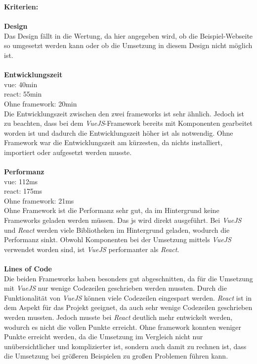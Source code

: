 \textbf{Kriterien:}\\\\
\textbf{Design}\\
Das Design fällt in die Wertung, da hier angegeben wird, ob die Beispiel-Webseite so umgesetzt werden kann oder ob die Umsetzung in diesem Design nicht möglich ist.\\\\
\newpage
\textbf{Entwicklungszeit}\\
\Gls{vue}: 40min\\
\Gls{react}: 55min\\
Ohne \Gls{framework}: 20min\\
Die Entwicklungszeit zwischen den zwei \Gls{framework}s ist sehr ähnlich. Jedoch ist zu beachten, dass bei dem \textit{VueJS}-Framework bereits mit Komponenten gearbeitet worden ist und dadurch die Entwicklungszeit höher ist als notwendig. Ohne Framework war die Entwicklungszeit am kürzesten, da nichts installiert, importiert oder aufgesetzt werden musste.\\\\
\textbf{Performanz}\\
\Gls{vue}: 112ms\\
\Gls{react}: 175ms\\
Ohne \Gls{framework}: 21ms\\
Ohne Framework ist die Performanz sehr gut, da im Hintergrund keine Frameworks geladen werden müssen. Das \Gls{js} wird direkt ausgeführt. Bei \textit{VueJS} und \textit{React} werden viele Bibliotheken im Hintergrund geladen, wodurch die Performanz sinkt. Obwohl Komponenten bei der Umsetzung mittels \textit{VueJS} verwendet worden sind, ist \textit{VueJS} performanter als \textit{React}.\\\\
\textbf{Lines of Code}\\
Die beiden Frameworks haben besonders gut abgeschnitten, da für die Umsetzung mit \textit{VueJS} nur wenige Codezeilen geschrieben werden mussten. Durch die Funktionalität von \textit{VueJS} können viele Codezeilen eingespart werden. \textit{React} ist in dem Aspekt für das Projekt geeignet, da auch sehr wenige Codezeilen geschrieben werden mussten. Jedoch musste bei \textit{React} deutlich mehr entwickelt werden, wodurch es nicht die vollen Punkte erreicht.
Ohne \Gls{framework} konnten weniger Punkte erreicht werden, da die Umsetzung im Vergleich nicht nur unübersichtlicher und komplizierter ist, sondern auch damit zu rechnen ist, dass die Umsetzung bei größeren Beispielen zu großen Problemen führen kann.
\newpage
